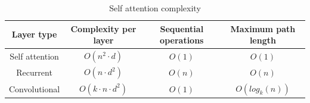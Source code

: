 \documentclass[\main/main.tex]{subfiles}
\begin{document}
\begin{table}[h!]
\centering
\begin{tabular}{||c c c c||} 
 \hline
 Layer type & Complexity per layer & Sequential operations & Maximum path length \\ [0.5ex] 
 \hline\hline
 Self attention & $O(n^2 \cdot d)$ & $O(1)$ & $O(1)$ \\ 
 \hline
 Recurrent & $O(n \cdot d^2)$ & $O(n)$ & $O(n)$ \\
 \hline
 Convolutional & $O(k \cdot n \cdot d^2)$ & $O(1)$ & $O(log_k(n))$ \\
 \hline
 
\end{tabular}
\caption{Self attention complexity}
 \label{table:complexity_self_attention}
\end{table}
\end{document}

